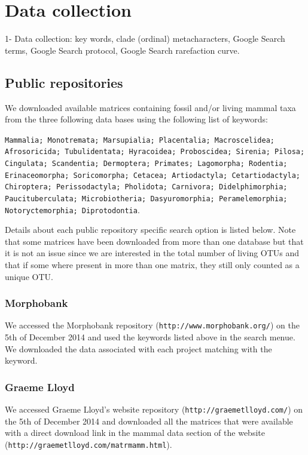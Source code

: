 

\bigskip

\section{Data collection}
1- Data collection: key words, clade (ordinal) metacharacters, Google Search terms, Google Search protocol, Google Search rarefaction curve.

\subsection{Public repositories}
We downloaded available matrices containing fossil and/or living mammal taxa from the three following data bases using the following list of keywords:

\texttt{Mammalia; Monotremata; Marsupialia; Placentalia; Macroscelidea; Afrosoricida; Tubulidentata; Hyracoidea; Proboscidea; Sirenia; Pilosa; Cingulata; Scandentia; Dermoptera; Primates; Lagomorpha; Rodentia; Erinaceomorpha; Soricomorpha; Cetacea; Artiodactyla; Cetartiodactyla; Chiroptera; Perissodactyla; Pholidota; Carnivora; Didelphimorphia; Paucituberculata; Microbiotheria; Dasyuromorphia; Peramelemorphia; Notoryctemorphia; Diprotodontia}.

Details about each public repository specific search option is listed below. Note that some matrices have been downloaded from more than one database but that it is not an issue since we are interested in the total number of living OTUs and that if some where present in more than one matrix, they still only counted as a unique OTU.

\subsubsection{Morphobank}
We accessed the Morphobank repository (\texttt{http://www.morphobank.org/}) on the 5th of December 2014 and used the keywords listed above in the search menue. We downloaded the data associated with each project matching with the keyword.

\subsubsection{Graeme Lloyd}
We accessed Graeme Lloyd's website repository (\texttt{http://graemetlloyd.com/}) on the 5th of December 2014 and downloaded all the matrices that were available with a direct download link in the mammal data section of the website (\texttt{http://graemetlloyd.com/matrmamm.html}).

